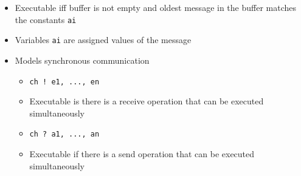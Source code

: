\begin{itemize}
\begin{itemize}
\begin{itemize}
\begin{itemize}
                            \item Executable iff buffer is not empty and oldest message in the buffer matches the constants \verb+ai+
                            \item Variables \verb+ai+ are assigned values of the message
                        \end{itemize}
                \end{itemize}
                \begin{itemize}
                    \item Models synchronous communication
                        \begin{itemize}
                            \item \verb+ch ! e1, ..., en+
                            \item Executable is there is a receive operation that can be executed simultaneously
                        \end{itemize}
                        \begin{itemize}
                            \item \verb+ch ? a1, ..., an+
                            \item Executable if there is a send operation that can be executed simultaneously
                        \end{itemize}
                \end{itemize}
        \end{itemize}
\end{itemize}

